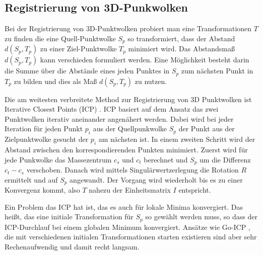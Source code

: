 \documentclass[12pt,titlepage, twoside]{article}
\begin{document}
\subsection{Registrierung von 3D-Punkwolken}
\label{sec:stand:registrierung}

Bei der Registrierung von 3D-Punktwolken probiert man eine Transformationen $T$ zu finden die eine Quell-Punktwolke $S_p$ so transformiert, dass der Abstand $d(S_p,T_p)$ zu einer Ziel-Punktwolke $T_p$ minimiert wird.
Das Abstandsmaß $d(S_p, T_p)$ kann verschieden formuliert werden. Eine Möglichkeit besteht darin die Summe über die Abstände eines jeden Punktes in $S_p$ 
zum nächsten Punkt in $T_p$ zu bilden und dies als Maß $d(S_p, T_p)$ zu nutzen.

Die am weitesten verbreitete Method zur Registrierung von 3D Punktwolken ist Iterative Closest Points (ICP) \cite{icp_org}. ICP basiert auf dem Ansatz das zwei Punktwolken iterativ aneinander angenähert werden.
Dabei wird bei jeder Iteration für jeden Punkt $p_i$ aus der Quellpunkwolke $S_p$ der Punkt aus der Zielpunktwolke gesucht der $p_i$ am nächsten ist. In einem zweiten Schritt wird der Abstand zwischen den korrespondierenden Punkten minimiert.
Zuerst wird für jede Punkwolke das Massezentrum $c_s$ und $c_t$ berechnet und $S_p$ um die Differenz $c_t - c_s$ verschoben. Danach wird mittels Singulärwertzerlegung die Rotation $R$ ermittelt und auf $S_p$ angewandt.
Der Vorgang wird wiederholt bis es zu einer Konvergenz kommt, also $T$ nahezu der Einheitsmatrix $I$ entspricht.

Ein Problem das ICP hat ist, das es auch für lokale Minima konvergiert. Das heißt, das eine initiale Transformation für $S_p$ so gewählt werden muss, so dass der ICP-Durchlauf bei einem globalen Minimum konvergiert.
Ansätze wie Go-ICP \cite{GoICP}, die mit verschiedenen initialen Transformationen starten existieren sind aber sehr Rechenaufwendig und damit recht langsam.
\end{document}
